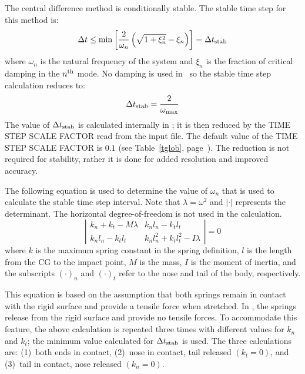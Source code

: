 The central difference method is conditionally stable.  The stable time
step for this method is:
\begin{displaymath}
\Delta t
\le\min\left[\frac{2}{\omega_n}\left(\sqrt{1+\xi^2_n}-\xi_n\right)\right]
= \Delta t_{\rm stab} 
\end{displaymath}
where $\omega_n$ is the natural frequency of the system and $\xi_n$ is
the fraction of critical damping in the $n^{\rm th}$ mode. No damping
is used in \SLAP\ so the stable time step calculation reduces to: 
\begin{displaymath}
\Delta t_{\rm stab} = \frac{2}{\omega_{\max}}
\end{displaymath}
The value of $\Delta t_{\rm stab}$ is calculated internally in \SLAP; it
is then reduced by the {\sf TIME STEP SCALE FACTOR} read from the input
file.  The default value of the {\sf TIME STEP SCALE FACTOR} is $0.1$
(see Table~\ref{tglob}, page~\pageref{tglob}).  The reduction is not
required for stability, rather it is done for added resolution and
improved accuracy. 

The following equation is used to determine the value of $\omega_n$
that is used to calculate the stable time step interval.  Note that
$\lambda = \omega^2$ and $|\cdot|$ represents the determinant.  The
horizontal degree-of-freedom is not used in the calculation. 
\begin{displaymath}
\left|\begin{array}{ll} k_n + k_t - M\lambda & k_n l_n - k_t l_t \\
                         k_n l_n - k_t l_t   & k_n l_n^2 + k_t l_t^2 - I\lambda
      \end{array}\right|
= 0
\end{displaymath}
where $k$ is the maximum spring constant in the spring definition, $l$
is the length from the CG to the impact point, $M$ is the mass, $I$ is
the moment of inertia, and the subscripts $(\cdot)_n$ and $(\cdot)_t$
refer to the nose and tail of the body, respectively.

This equation is based on the assumption that both springs remain in
contact with the rigid surface and provide a tensile force when
stretched.  In \SLAP, the springs release from the rigid surface and
provide no tensile forces.  To accommodate this feature, the above
calculation is repeated three times with different values for $k_n$ and
$k_t$; the minimum value calculated for $\Delta t_{\rm stab}$ is
used.  The three calculations are: (1)~both ends in contact, (2)~nose in
contact, tail released $(k_t=0)$, and (3)~tail in contact, nose released 
$(k_n=0)$.


